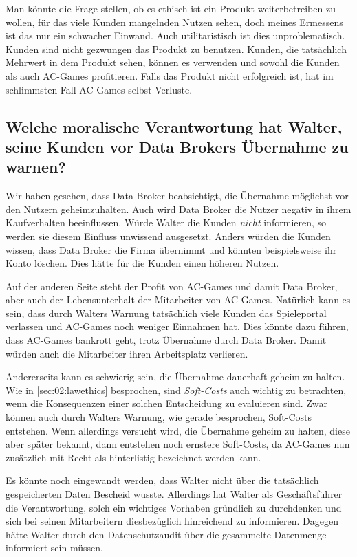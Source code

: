Man könnte die Frage stellen, ob es ethisch ist ein Produkt weiterbetreiben zu wollen, für das viele Kunden mangelnden Nutzen sehen, doch meines Ermessens ist das nur ein schwacher Einwand. 
Auch utilitaristisch ist dies unproblematisch. Kunden sind nicht gezwungen das Produkt zu benutzen.
Kunden, die tatsächlich Mehrwert in dem Produkt sehen, können es verwenden und sowohl die Kunden als auch AC-Games profitieren.
Falls das Produkt nicht erfolgreich ist, hat im schlimmsten Fall AC-Games selbst Verluste.

\subsection{Welche moralische Verantwortung hat Walter, seine Kunden vor Data Brokers Übernahme zu warnen? \cite{kees_faites_2017}}

Wir haben gesehen, dass Data Broker beabsichtigt, die Übernahme möglichst vor den Nutzern geheimzuhalten.
Auch wird Data Broker die Nutzer negativ in ihrem Kaufverhalten beeinflussen.
Würde Walter die Kunden \emph{nicht} informieren, so werden sie diesem Einfluss unwissend ausgesetzt.
Anders würden die Kunden wissen, dass Data Broker die Firma übernimmt und könnten beispielsweise ihr Konto löschen.
Dies hätte für die Kunden einen höheren Nutzen.

Auf der anderen Seite steht der Profit von AC-Games und damit Data Broker, aber auch der Lebensunterhalt der Mitarbeiter von AC-Games.
Natürlich kann es sein, dass durch Walters Warnung tatsächlich viele Kunden das Spieleportal verlassen und AC-Games noch weniger Einnahmen hat.
Dies könnte dazu führen, dass AC-Games bankrott geht, trotz Übernahme durch Data Broker.
Damit würden auch die Mitarbeiter ihren Arbeitsplatz verlieren. 

Andererseits kann es schwierig sein, die Übernahme dauerhaft geheim zu halten.
Wie in \cref{sec:02:lawethics} besprochen, sind \emph{Soft-Costs} auch wichtig zu betrachten, wenn die Konsequenzen einer solchen Entscheidung zu evaluieren sind.
Zwar können auch durch Walters Warnung, wie gerade besprochen, Soft-Costs entstehen.
Wenn allerdings versucht wird, die Übernahme geheim zu halten, diese aber später bekannt, dann entstehen noch ernstere Soft-Costs, da AC-Games nun zusätzlich mit Recht als hinterlistig bezeichnet werden kann.

Es könnte noch eingewandt werden, dass Walter nicht über die tatsächlich gespeicherten Daten Bescheid wusste.
Allerdings hat Walter als Geschäftsführer die Verantwortung, solch ein wichtiges Vorhaben gründlich zu durchdenken und sich bei seinen Mitarbeitern diesbezüglich hinreichend zu informieren.
Dagegen hätte Walter durch den Datenschutzaudit über die gesammelte Datenmenge informiert sein müssen.

